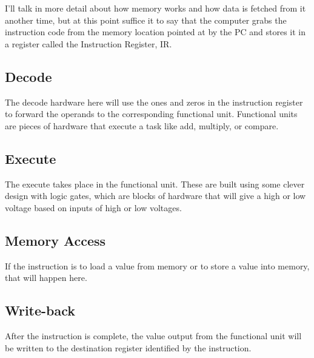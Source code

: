 \documentclass{IEEEtran}
\begin{document}
I'll talk in more detail about how memory works and how data is fetched from it another time, but at this point suffice it to say that the computer grabs the instruction code from the memory location pointed at by the PC and stores it in a register called the Instruction Register, IR.  

\subsection{Decode}

The decode hardware here will use the ones and zeros in the instruction register to forward the operands to the corresponding functional unit. Functional units are pieces of hardware that execute a task like add, multiply, or compare. \medskip


\subsection{Execute}

The execute takes place in the functional unit. These are built using some clever design with logic gates, which are blocks of hardware that will give a high or low voltage based on inputs of high or low voltages. 


\subsection{Memory Access}

If the instruction is to load a value from memory or to store a value into memory, that will happen here.

\subsection{Write-back}

After the instruction is complete, the value output from the functional unit will be written to the destination register identified by the instruction.





\end{document}
